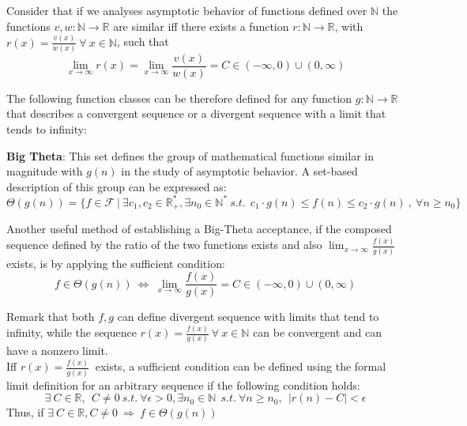 \begin{lemma}
    Consider that if we analyses asymptotic behavior of functions defined over $\mathbb{N}$ the functions $v,w:\mathbb{N}\longrightarrow\mathbb{R}$ are similar iff there exists a function $r:\mathbb{N}\longrightarrow\mathbb{R}$, with $r(x) = \frac{v(x)}{w(x)}\ \forall\ x\in\mathbb{N}$, such that
    \[\lim_{x\to\infty} r(x) = \lim_{x\to\infty} \frac{v(x)}{w(x)} = C \in (-\infty, 0) \cup (0,\infty) \]
\end{lemma}

The following function classes can be therefore defined for any function $g:\mathbb{N}\longrightarrow\mathbb{R}$ that describes a convergent sequence or a divergent sequence with a limit that tends to infinity:
\begin{definition}
    \textbf{Big Theta}: This set defines the group of mathematical functions similar in magnitude with  $g(n)$ in the study of asymptotic behavior. A set-based description of this group can be expressed as:
    \[\Theta(g(n))= \lbrace f \in \mathcal{F}\ |\ \exists c_{1}, c_{2} \in \mathbb{R}^{*}_{+}, \exists n_{0} \in \mathbb{N}^{*}\ s.t.\ \ c_{1} \cdot g(n) \leq f(n) \leq c_{2} \cdot g(n)\ ,\  \forall n \geq n_{0} \rbrace\]
\end{definition}

\begin{lemma}
    Another useful method of establishing a Big-Theta acceptance, if the composed sequence defined by the ratio of the two functions exists and also $ \lim_{x\to\infty} \frac{f(x)}{g(x)}$ exists, is by applying the sufficient condition:
    \[ f \in \Theta(g(n))\ \Leftrightarrow\ \lim_{x\to\infty} \frac{f(x)}{g(x)} = C \in (-\infty, 0) \cup (0,\infty) \]
\end{lemma}

Remark that both $f,g$ can define divergent sequence with limits that tend to infinity, while the sequence $r(x) = \frac{f(x)}{g(x)}\ \forall\ x\in\mathbb{N}$ can be convergent and can have a nonzero limit. \\
Iff $ r(x) = \frac{f(x)}{g(x)}\ $ exists, a sufficient condition can be defined using the formal limit definition for an arbitrary sequence if the following condition holds:
\[\exists \  C \in \mathbb{R}, \ \ C \neq 0 \ s.t. \ \forall \epsilon > 0,\exists n_{0} \in \mathbb{N}\ \ s.t.\ \forall n\geq n_{0}, \ \  |r(n) - C| < \epsilon  \]
Thus, if $ \exists \  C \in \mathbb{R}, C \neq 0 \  \Rightarrow\  f \in \Theta(g(n))\ $


